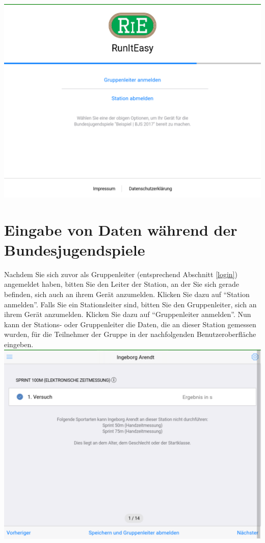 \documentclass[11pt,a4paper,titlepage,german]{article}
\begin{document}
			\includegraphics[width=\textwidth]{LoggedIn-Station}
			
		\section[Datenerfassung]{Eingabe von Daten während der Bundesjugendspiele}
			Nachdem Sie sich zuvor als Gruppenleiter (entsprechend Abschnitt \ref{login}) angemeldet haben, bitten Sie den Leiter der Station, an der Sie sich gerade befinden, sich auch an ihrem Gerät anzumelden. Klicken Sie dazu auf “Station anmelden”. Falls Sie ein Stationsleiter sind, bitten Sie den Gruppenleiter, sich an ihrem Gerät anzumelden. Klicken Sie dazu auf “Gruppenleiter anmelden”.
			Nun kann der Stations- oder Gruppenleiter die Daten, die an dieser Station gemessen wurden, für die Teilnehmer der Gruppe in der nachfolgenden Benutzeroberfläche eingeben.\\
			\includegraphics[width=\textwidth]{InputData}
			
\end{document}
